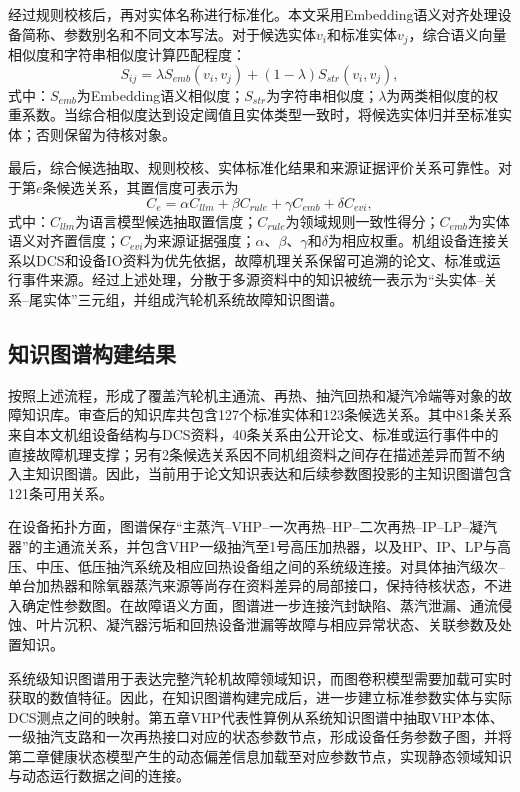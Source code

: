 经过规则校核后，再对实体名称进行标准化。本文采用Embedding语义对齐处理设备简称、参数别名和不同文本写法\cite{Reimers2019SentenceBERT}。对于候选实体$v_i$和标准实体$v_j$，综合语义向量相似度和字符串相似度计算匹配程度：
\begin{equation}
S_{ij}=\lambda S_{emb}(v_i,v_j)+(1-\lambda)S_{str}(v_i,v_j),
\end{equation}
式中：$S_{emb}$为Embedding语义相似度；$S_{str}$为字符串相似度；$\lambda$为两类相似度的权重系数。当综合相似度达到设定阈值且实体类型一致时，将候选实体归并至标准实体；否则保留为待核对象。

最后，综合候选抽取、规则校核、实体标准化结果和来源证据评价关系可靠性。对于第$e$条候选关系，其置信度可表示为
\begin{equation}
C_e=\alpha C_{llm}+\beta C_{rule}+\gamma C_{emb}+\delta C_{evi},
\end{equation}
式中：$C_{llm}$为语言模型候选抽取置信度；$C_{rule}$为领域规则一致性得分；$C_{emb}$为实体语义对齐置信度；$C_{evi}$为来源证据强度；$\alpha$、$\beta$、$\gamma$和$\delta$为相应权重。机组设备连接关系以DCS和设备IO资料为优先依据，故障机理关系保留可追溯的论文、标准或运行事件来源。经过上述处理，分散于多源资料中的知识被统一表示为“头实体--关系--尾实体”三元组，并组成汽轮机系统故障知识图谱。

\subsection{知识图谱构建结果}
\label{subsec:kg_result_v8}

按照上述流程，形成了覆盖汽轮机主通流、再热、抽汽回热和凝汽冷端等对象的故障知识库。审查后的知识库共包含127个标准实体和123条候选关系。其中81条关系来自本文机组设备结构与DCS资料，40条关系由公开论文、标准或运行事件中的直接故障机理支撑；另有2条候选关系因不同机组资料之间存在描述差异而暂不纳入主知识图谱。因此，当前用于论文知识表达和后续参数图投影的主知识图谱包含121条可用关系。

在设备拓扑方面，图谱保存“主蒸汽--VHP--一次再热--HP--二次再热--IP--LP--凝汽器”的主通流关系，并包含VHP一级抽汽至1号高压加热器，以及HP、IP、LP与高压、中压、低压抽汽系统及相应回热设备组之间的系统级连接。对具体抽汽级次--单台加热器和除氧器蒸汽来源等尚存在资料差异的局部接口，保持待核状态，不进入确定性参数图。在故障语义方面，图谱进一步连接汽封缺陷、蒸汽泄漏、通流侵蚀、叶片沉积、凝汽器污垢和回热设备泄漏等故障与相应异常状态、关联参数及处置知识。

系统级知识图谱用于表达完整汽轮机故障领域知识，而图卷积模型需要加载可实时获取的数值特征。因此，在知识图谱构建完成后，进一步建立标准参数实体与实际DCS测点之间的映射。第五章VHP代表性算例从系统知识图谱中抽取VHP本体、一级抽汽支路和一次再热接口对应的状态参数节点，形成设备任务参数子图，并将第二章健康状态模型产生的动态偏差信息加载至对应参数节点，实现静态领域知识与动态运行数据之间的连接。

